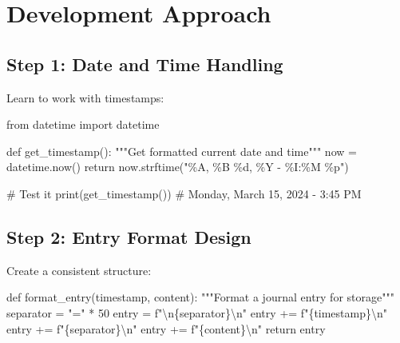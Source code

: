 \documentclass[
  letterpaper,
  DIV=11,
  numbers=noendperiod,
  oneside]{scrreprt}
\newenvironment{Shaded}{}{}
\newcommand{\BuiltInTok}[1]{\textcolor[rgb]{0.84,0.23,0.29}{#1}}
\newcommand{\CharTok}[1]{\textcolor[rgb]{0.01,0.18,0.38}{#1}}
\newcommand{\CommentTok}[1]{\textcolor[rgb]{0.42,0.45,0.49}{#1}}
\newcommand{\ControlFlowTok}[1]{\textcolor[rgb]{0.84,0.23,0.29}{#1}}
\newcommand{\DecValTok}[1]{\textcolor[rgb]{0.00,0.36,0.77}{#1}}
\newcommand{\ImportTok}[1]{\textcolor[rgb]{0.01,0.18,0.38}{#1}}
\newcommand{\KeywordTok}[1]{\textcolor[rgb]{0.84,0.23,0.29}{#1}}
\newcommand{\NormalTok}[1]{\textcolor[rgb]{0.14,0.16,0.18}{#1}}
\newcommand{\OperatorTok}[1]{\textcolor[rgb]{0.14,0.16,0.18}{#1}}
\newcommand{\SpecialCharTok}[1]{\textcolor[rgb]{0.00,0.36,0.77}{#1}}
\newcommand{\SpecialStringTok}[1]{\textcolor[rgb]{0.01,0.18,0.38}{#1}}
\newcommand{\StringTok}[1]{\textcolor[rgb]{0.01,0.18,0.38}{#1}}
\begin{document}
\section{Development Approach}\label{development-approach-6}

\subsection{Step 1: Date and Time
Handling}\label{step-1-date-and-time-handling}

Learn to work with timestamps:

\begin{Shaded}
\begin{Highlighting}[]
\ImportTok{from}\NormalTok{ datetime }\ImportTok{import}\NormalTok{ datetime}

\KeywordTok{def}\NormalTok{ get\_timestamp():}
    \CommentTok{"""Get formatted current date and time"""}
\NormalTok{    now }\OperatorTok{=}\NormalTok{ datetime.now()}
    \ControlFlowTok{return}\NormalTok{ now.strftime(}\StringTok{"\%A, \%B }\SpecialCharTok{\%d}\StringTok{, \%Y {-} \%I:\%M \%p"}\NormalTok{)}

\CommentTok{\# Test it}
\BuiltInTok{print}\NormalTok{(get\_timestamp())  }\CommentTok{\# Monday, March 15, 2024 {-} 3:45 PM}
\end{Highlighting}
\end{Shaded}

\subsection{Step 2: Entry Format
Design}\label{step-2-entry-format-design}

Create a consistent structure:

\begin{Shaded}
\begin{Highlighting}[]
\KeywordTok{def}\NormalTok{ format\_entry(timestamp, content):}
    \CommentTok{"""Format a journal entry for storage"""}
\NormalTok{    separator }\OperatorTok{=} \StringTok{"="} \OperatorTok{*} \DecValTok{50}
\NormalTok{    entry }\OperatorTok{=} \SpecialStringTok{f"}\CharTok{\textbackslash{}n}\SpecialCharTok{\{}\NormalTok{separator}\SpecialCharTok{\}}\CharTok{\textbackslash{}n}\SpecialStringTok{"}
\NormalTok{    entry }\OperatorTok{+=} \SpecialStringTok{f"}\SpecialCharTok{\{}\NormalTok{timestamp}\SpecialCharTok{\}}\CharTok{\textbackslash{}n}\SpecialStringTok{"}
\NormalTok{    entry }\OperatorTok{+=} \SpecialStringTok{f"}\SpecialCharTok{\{}\NormalTok{separator}\SpecialCharTok{\}}\CharTok{\textbackslash{}n}\SpecialStringTok{"}
\NormalTok{    entry }\OperatorTok{+=} \SpecialStringTok{f"}\SpecialCharTok{\{}\NormalTok{content}\SpecialCharTok{\}}\CharTok{\textbackslash{}n}\SpecialStringTok{"}
    \ControlFlowTok{return}\NormalTok{ entry}
\end{Highlighting}
\end{Shaded}
\end{document}
